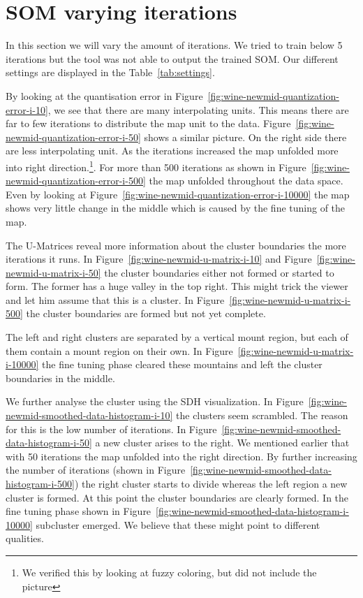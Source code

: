 \documentclass{acm_proc_article-sp}
\begin{document}
\section{SOM varying iterations}

In this section we will vary the amount of iterations. We tried to train below 5 iterations but the tool was not able to output the trained SOM.
Our different settings are displayed in the Table~\ref{tab:settings}.

By looking at the quantisation error in Figure~\ref{fig:wine-newmid-quantization-error-i-10}, 
we see that there are many interpolating units. This means there are far to few iterations to
distribute the map unit to the data. Figure~\ref{fig:wine-newmid-quantization-error-i-50} shows
a similar picture. On the right side there are less interpolating unit. As the iterations increased
the map unfolded more into right direction.\footnote{We verified this by looking at fuzzy coloring, but did not include the picture}.
For more than 500 iterations as shown in Figure~\ref{fig:wine-newmid-quantization-error-i-500} the map unfolded throughout the data space.
Even by looking at Figure~\ref{fig:wine-newmid-quantization-error-i-10000} the map shows very little change in the middle which
is caused by the fine tuning of the map.

The U-Matrices reveal more information about the cluster boundaries the more iterations it runs.
In Figure~\ref{fig:wine-newmid-u-matrix-i-10} and 
Figure~\ref{fig:wine-newmid-u-matrix-i-50} the cluster boundaries either not formed or started to form. The
former has a huge valley in the top right. This might trick the viewer and let him assume that this is a cluster.
In Figure~\ref{fig:wine-newmid-u-matrix-i-500} the cluster boundaries are formed but not yet complete.

The left and right clusters are separated by a vertical mount region, but each of them contain a
mount region on their own. In Figure~\ref{fig:wine-newmid-u-matrix-i-10000} the fine tuning phase cleared these mountains and
left the cluster boundaries in the middle.

We further analyse the cluster using the SDH visualization. In Figure~\ref{fig:wine-newmid-smoothed-data-histogram-i-10} the
clusters seem scrambled. The reason for this is the low number of iterations.
In Figure~\ref{fig:wine-newmid-smoothed-data-histogram-i-50} a new cluster arises to the right. We mentioned earlier that 
with 50 iterations the map unfolded into the right direction. By further increasing the number of iterations
(shown in Figure~\ref{fig:wine-newmid-smoothed-data-histogram-i-500}) the right cluster starts to divide whereas the left region
a new cluster is formed. At this point the cluster boundaries are clearly formed. In the fine tuning phase
shown in Figure~\ref{fig:wine-newmid-smoothed-data-histogram-i-10000} subcluster emerged. We believe that these might point to different
qualities.
\end{document}
